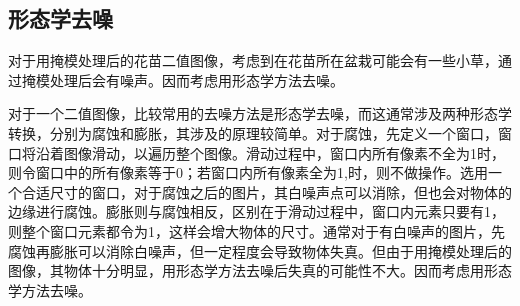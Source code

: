 \subsection{形态学去噪}
对于用掩模处理后的花苗二值图像，考虑到在花苗所在盆栽可能会有一些小草，通过掩模处理后会有噪声。因而考虑用形态学方法去噪。

对于一个二值图像，比较常用的去噪方法是形态学去噪，而这通常涉及两种形态学转换，分别为腐蚀和膨胀，其涉及的原理较简单。对于腐蚀，先定义一个窗口，窗口将沿着图像滑动，以遍历整个图像。滑动过程中，窗口内所有像素不全为1时，则令窗口中的所有像素等于0；若窗口内所有像素全为1,时，则不做操作。选用一个合适尺寸的窗口，对于腐蚀之后的图片，其白噪声点可以消除，但也会对物体的边缘进行腐蚀。膨胀则与腐蚀相反，区别在于滑动过程中，窗口内元素只要有1，则整个窗口元素都令为1，这样会增大物体的尺寸。通常对于有白噪声的图片，先腐蚀再膨胀可以消除白噪声，但一定程度会导致物体失真。但由于用掩模处理后的图像，其物体十分明显，用形态学方法去噪后失真的可能性不大。因而考虑用形态学方法去噪。
